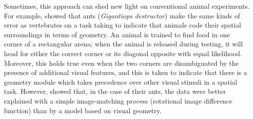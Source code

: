 Sometimes, this approach can shed new light on conventional animal experiments.
For example, \cite{Wystrach2011} showed that ants (\emph{Gigantiops destructor}) make the same kinds of error as vertebrates on a task taking to indicate that animals code their spatial surroundings in terms of geometry.
An animal is trained to find food in one corner of a rectangular arena; when the animal is released during testing, it will head for either the correct corner or its diagonal opposite with equal likelihood.
Moreover, this holds true even when the two corners are disambiguated by the presence of additional visual features, and this is taken to indicate that there is a geometry module which takes precedence over other visual stimuli in a spatial task.
However, \cite{Wystrach2011} showed that, in the case of their ants, the data were better explained with a simple image-matching process (rotational image difference function) \cite{Philippides2011,Zeil2003} than by a model based on visual geometry.

\begin{comment}
Faced with this startling fact, there are two common reactions.
The first is to denigrate insects' intelligence: to argue that what appear to be complex behaviours are really just the combined actions of elaborate reflexes, a view shared by Aristotle and Descartes.
The second is to defend insects, by offering up the range and diversity of insect behaviour as evidence that invertebrates are sometimes as `clever' as vertebrates.
Our own viewpoint differs from both of these.
We instead argue that while insects possess an impressive behavioural repertoire, the fact that these behaviours may be partially reducible to simple, task-specific competencies is precisely what makes them such a fruitful model for computational neuroscience.

Vision is known to play a role in a many behaviours exhibited by the fruit fly \emph{Drosophila melanogaster} \cite<review:>{Borst2014}, including fixation towards vertical bars [cits], avoidance of expanding objects in the lateral visual field [cits], landing [name+cits in house fly 53--57], escape \cite{Card2008}, the optomotor response [cits] and mate pursuit [name+cits] [\& others?].
The extent to which these behaviours depend on specialised, task-specific modules \emph{vs.} common, more `general purpose' machinery is currently not known.
What might be expected, however, given that fruit flies possess only a few hundred thousand neurons \cite{Borst2014}, is that evolution will have favoured, where possible, a single computational unit supporting multiple behaviours over multiple, hyperspecialised units performing the same function.

[For example, the landing and avoidance responses are both triggered by expanding visual stimuli and are both implemented in the lobula plate -- expand and check.]

\end{comment}


